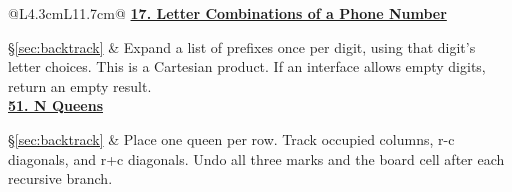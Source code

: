 \documentclass[11pt]{article}
\newcommand{\sect}[1]{\hyperref[sec:#1]{\S\ref*{sec:#1}}}
\begin{document}
\begin{longtable}{@{}L{4.3cm}L{11.7cm}@{}}
\hypertarget{lc17}{}\href{https://leetcode.com/problems/letter-combinations-of-a-phone-number/}{\textbf{17. Letter Combinations of a Phone Number}}\par\sect{backtrack} & Expand a list of prefixes once per digit, using that digit's letter choices. This is a Cartesian product. If an interface allows empty digits, return an empty result.\\[4pt]
\hypertarget{lc51}{}\href{https://leetcode.com/problems/n-queens/}{\textbf{51. N Queens}}\par\sect{backtrack} & Place one queen per row. Track occupied columns, r-c diagonals, and r+c diagonals. Undo all three marks and the board cell after each recursive branch.\\[4pt]
\bottomrule
\end{longtable}
\end{document}
